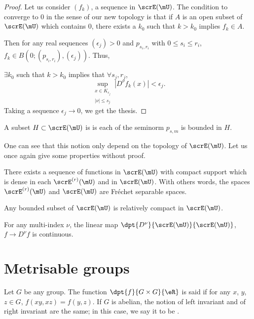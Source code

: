 \begin{proof}
Let us consider $(f_k)$, a sequence in $\scrE(\mU)$. The condition to converge to $0$ in the sense of our new topology is that if $A$ is an open subset of $\scrE(\mU)$ which contains $0$, there exists a $k_0$ such that $k>k_0$ implies $f_k\in A$.

Then for any real sequences $(\epsilon_j)>0$ and $p_{s_i,r_i}$ with $0\leq s_i\leq r_i$, $f_k\in B( 0;(p_{s_i,r_i}),(\epsilon_j) )$. Thus,

$\exists k_0$ such that $k>k_0$ implies that $\forall s_j,r_j$,
\[
   \sup_{ \substack{ x\in K_{r_j}\\|\nu|\leq s_j } }|D^{\nu}f_k(x)|<\epsilon_j.
\]
Taking a sequence $\epsilon_j\to 0$, we get the thesis.
\end{proof}


\begin{definition}
A subset $H\subset\scrE(\mU)$ is  is each of the seminorm $p_{s,m}$ is bounded in $H$.
\label{def:bounded}
\end{definition}
One can see that this notion only depend on the topology of $\scrE(\mU)$. Let us once again give some properties without proof.

\begin{proposition}
There exists a sequence of functions in $\scrE(\mU)$ with compact support which is dense in each $\scrE^{(r)}(\mU)$ and in $\scrE(\mU)$. With others words, the spaces $\scrE^{(r)}(\mU)$ and $\scrE(\mU)$ are Fréchet separable spaces. 
\label{prop:E_Frechet}
\end{proposition}

\begin{proposition}
Any bounded subset of $\scrE(\mU)$ is relatively compact in $\scrE(\mU)$.
\end{proposition}

\begin{proposition}
For any multi-index $\nu$, the linear map $\dpt{D^{\nu}}{\scrE(\mU)}{\scrE(\mU)}$, $f\to D^{\nu}f$ is continuous.
\end{proposition}


\section{Metrisable groups}\label{sec:metrisable_groups}

Let $G$ be any group. The function $\dpt{f}{G\times G}{\eR}$ is said  if for any $x$, $y$, $z\in G$, $f(xy,xz)=f(y,z)$. If $G$ is abelian, the notion of left invariant and of right invariant are the same; in this case, we say it to be .

